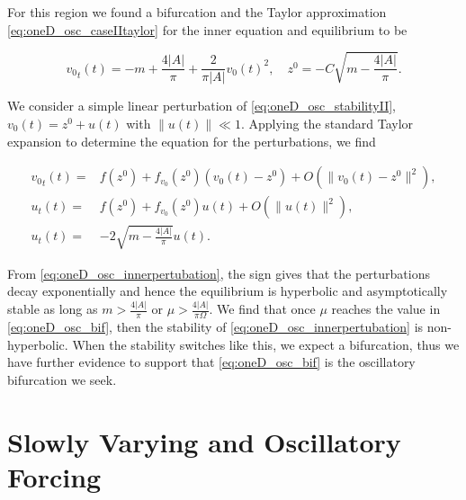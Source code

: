 For this region we found a bifurcation and the Taylor approximation \eqref{eq:oneD_osc_caseIItaylor} for the inner equation and equilibrium to be

\begin{equation}\label{eq:oneD_osc_stabilityII}
{v_0}_t(t)= -m +\frac{4|A|}{\pi}+\frac{2}{\pi |A|}v_0(t)^2,\quad z^0=-C \sqrt{m-\frac{4|A|}{\pi}}.
\end{equation}

We consider a simple linear perturbation of \eqref{eq:oneD_osc_stabilityII}, $v_0(t)=z^0+u(t)$ with $\lVert u(t) \rVert \ll 1$. Applying the standard Taylor expansion to determine the equation for the perturbations, we find

\begin{equation}\label{eq:oneD_osc_innerpertubation}
\begin{aligned}
{v_0}_t(t) =& f(z^0)+f_{v_0}(z^0)(v_0(t)-z^0)+ O(\lVert v_0(t)-z^0\rVert^2),\\ 
u_t(t) =& f(z^0)+f_{v_0}(z^0)u(t)+O(\lVert u(t) \rVert^2),\\
u_t(t) =& -2\sqrt{m-\frac{4|A|}{\pi}} u(t) .
\end{aligned}
\end{equation}

From \eqref{eq:oneD_osc_innerpertubation}, the sign gives that the perturbations decay exponentially and hence the equilibrium is hyperbolic and asymptotically stable as long as $m>\frac{4|A|}{\pi}$ or $\mu>\frac{4|A|}{\pi \Omega}$. We find that once $\mu$ reaches the value in \eqref{eq:oneD_osc_bif}, then the stability of \eqref{eq:oneD_osc_innerpertubation} is non-hyperbolic. When the stability switches like this, we expect a bifurcation, thus we have further evidence to support that \eqref{eq:oneD_osc_bif} is the oscillatory bifurcation we seek.

\section{Slowly Varying and Oscillatory Forcing}
\label{sec:oneD_slowosc}

